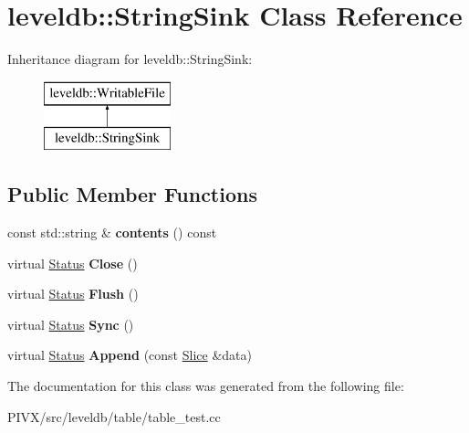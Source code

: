 \hypertarget{classleveldb_1_1_string_sink}{}\section{leveldb\+:\+:String\+Sink Class Reference}
\label{classleveldb_1_1_string_sink}
Inheritance diagram for leveldb\+:\+:String\+Sink\+:\begin{figure}[H]
\begin{center}
\leavevmode
\includegraphics[height=2.000000cm]{classleveldb_1_1_string_sink}
\end{center}
\end{figure}
\subsection*{Public Member Functions}
\begin{DoxyCompactItemize}
\item 
\mbox{\label{classleveldb_1_1_string_sink_aef5436853b707a7d2ddc491cbdbf33ef}} 
const std\+::string \& {\bfseries contents} () const
\item 
\mbox{\label{classleveldb_1_1_string_sink_a40e2142f8078720ecbad8a1d48be6f48}} 
virtual \mbox{\hyperlink{classleveldb_1_1_status}{Status}} {\bfseries Close} ()
\item 
\mbox{\label{classleveldb_1_1_string_sink_af8dc901a44e89b56726bde2782a41ab7}} 
virtual \mbox{\hyperlink{classleveldb_1_1_status}{Status}} {\bfseries Flush} ()
\item 
\mbox{\label{classleveldb_1_1_string_sink_a77f1f2b9797737fbd89211ba0bb9a93e}} 
virtual \mbox{\hyperlink{classleveldb_1_1_status}{Status}} {\bfseries Sync} ()
\item 
\mbox{\label{classleveldb_1_1_string_sink_a10db68412947f16bde307677a663c241}} 
virtual \mbox{\hyperlink{classleveldb_1_1_status}{Status}} {\bfseries Append} (const \mbox{\hyperlink{classleveldb_1_1_slice}{Slice}} \&data)
\end{DoxyCompactItemize}


The documentation for this class was generated from the following file\+:\begin{DoxyCompactItemize}
\item 
P\+I\+V\+X/src/leveldb/table/table\+\_\+test.\+cc\end{DoxyCompactItemize}
